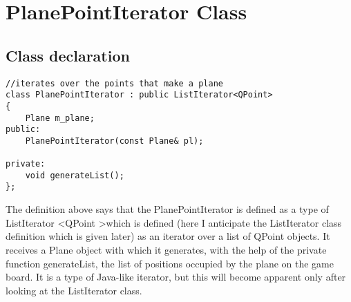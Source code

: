 \section{PlanePointIterator Class}

\subsection {Class declaration}

\begin{lstlisting}
//iterates over the points that make a plane
class PlanePointIterator : public ListIterator<QPoint>
{
    Plane m_plane;
public:
    PlanePointIterator(const Plane& pl);

private:
    void generateList();
};
\end{lstlisting}

The definition above says that the PlanePointIterator is defined as a type of ListIterator \textless QPoint \textgreater which is defined (here I anticipate the ListIterator class definition which is given later) as an iterator over a list of QPoint objects. It receives a Plane object with which it generates, with the help of the private function generateList, the list of positions occupied by the plane on the game board. It is a type of Java-like iterator, but this will become apparent only after looking at the ListIterator class. 

